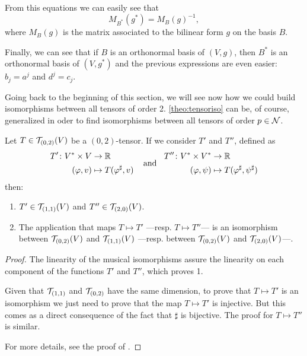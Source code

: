 From this equations we can easily see that
\[
	M_{B^*}(g^*) = M_B(g)^{-1},
\]
where $M_B(g)$ is the matrix associated to the bilinear form $g$ on the basis $B$.

Finally, we can see that if $B$ is an orthonormal basis of $(V,g)$, then $B^*$ is an orthonormal basis of $(V,g^*)$ and the previous expressions are even easier: $b_j = a^j$ and $d^j = c_j$.

Going back to the beginning of this section, we will see now how we could build isomorphisms between all tensors of order 2. \autoref{theo:tensoriso} can be, of course, generalized in oder to find isomorphisms between all tensors of order $p \in {\mathcal N}$.

\begin{theorem}
	\label{theo:tensoriso}
	Let $T\in{\mathcal T}_{(0,2)}(V)$ be a $(0,2)$-tensor. If we consider $T'$ and $T''$, defined as
	\[	
	\begin{aligned}
	T' \colon V^* \times V &\to \mathbb{R} \\
	(\varphi, v) &\mapsto T(\varphi^\sharp, v)
	\end{aligned} \;\;\;\textrm{ and }\;\;
	\begin{aligned}
	T'' \colon V^* \times V^* &\to \mathbb{R} \\
	(\varphi, \psi) &\mapsto T(\varphi^\sharp, \psi^\sharp)
	\end{aligned}
	\]
	then:
	\begin{enumerate}
		\item $T'\in{\mathcal T}_{(1,1)}(V)$ and $T''\in{\mathcal T}_{(2,0)}(V)$.
		\item The application that maps $T \mapsto T'$ ---resp. $T \mapsto T''$--- is an isomorphism between ${\mathcal T}_{(0,2)}(V)$ and ${\mathcal T}_{(1,1)}(V)$ ---resp. between ${\mathcal T}_{(0,2)}(V)$ and ${\mathcal T}_{(2,0)}(V)$---.
	\end{enumerate}
\end{theorem}

\begin{proof}
	The linearity of the musical isomorphisms assure the linearity on each component of the functions $T'$ and $T''$, which proves 1.
	
	Given that ${\mathcal T}_{(1,1)}$ and ${\mathcal T}_{(0,2)}$ have the same dimension, to prove that $T \mapsto T'$ is an isomorphism we just need to prove that the map $T \mapsto T'$ is injective. But this comes as a direct consequence of the fact that $\sharp$ is bijective. The proof for $T \mapsto T''$ is similar.
	
	For more details, see the proof of \cite[Th. 9.33]{romero86}.
\end{proof}

